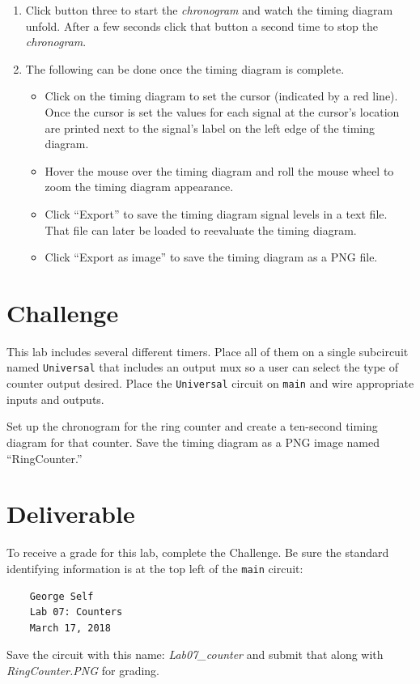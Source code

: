 \begin{enumerate}
	\item Click button three to start the \textit{chronogram} and watch the timing diagram unfold. After a few seconds click that button a second time to stop the \textit{chronogram}.
	
	\item The following can be done once the timing diagram is complete.
	
	\begin{itemize}
		\item Click on the timing diagram to set the cursor (indicated by a red line). Once the cursor is set the values for each signal at the cursor's location are printed next to the signal's label on the left edge of the timing diagram.
		\item Hover the mouse over the timing diagram and roll the mouse wheel to zoom the timing diagram appearance.
		\item Click ``Export'' to save the timing diagram signal levels in a text file. That file can later be loaded to reevaluate the timing diagram.
		\item Click ``Export as image'' to save the timing diagram as a PNG file.
	\end{itemize}
	
\end{enumerate}

\section{Challenge}

This lab includes several different timers. Place all of them on a single subcircuit named \lstinline[columns=fixed]|Universal| that includes an output mux so a user can select the type of counter output desired. Place the \lstinline[columns=fixed]|Universal| circuit on \lstinline[columns=fixed]|main| and wire appropriate inputs and outputs.

Set up the chronogram for the ring counter and create a ten-second timing diagram for that counter. Save the timing diagram as a PNG image named ``RingCounter.''

\section{Deliverable}

To receive a grade for this lab, complete the Challenge. Be sure the standard identifying information is at the top left of the \lstinline{main} circuit: 

\bigskip
\begin{minipage}{\linewidth}
	\begin{verbatim}
	George Self
	Lab 07: Counters
	March 17, 2018
	\end{verbatim}
\end{minipage}
\bigskip

Save the circuit with this name: \textit{Lab07\_counter} and submit that along with \textit{RingCounter.PNG} for grading.


